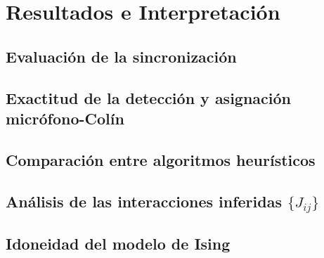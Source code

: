\chapter{Resultados e Interpretación}\label{chapter:Results}



\section{Evaluación de la sincronización}
\label{sec:res_sincronizacion}


\section{Exactitud de la detección y asignación micrófono-Colín}
\label{sec:res_asignacion}

\section{Comparación entre algoritmos heurísticos}
\label{sec:res_comparacion}


\section{Análisis de las interacciones inferidas \(\{J_{ij}\}\)}
\label{sec:res_interacciones}


\section{Idoneidad del modelo de Ising}
\label{sec:res_idoneidad}